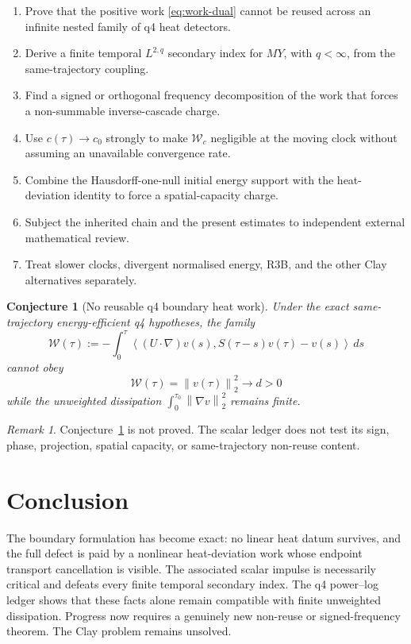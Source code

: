 \documentclass[11pt]{article}
\newtheorem{conjecture}[theorem]{Conjecture}
\theoremstyle{remark}
\newtheorem{remark}[theorem]{Remark}
\newcommand{\norm}[1]{\left\|#1\right\|}
\newcommand{\ip}[2]{\left\langle #1,#2\right\rangle}
\begin{document}
\begin{enumerate}
 \item Prove that the positive work
 \eqref{eq:work-dual} cannot be reused across an infinite nested family
 of q4 heat detectors.
 \item Derive a finite temporal \(L^{2,q}\) secondary index for
 \(MY\), with \(q<\infty\), from the same-trajectory coupling.
 \item Find a signed or orthogonal frequency decomposition of the work
 that forces a non-summable inverse-cascade charge.
 \item Use \(c(\tau)\to c_0\) strongly to make
 \(\mathcal W_c\) negligible at the moving clock without assuming an
 unavailable convergence rate.
 \item Combine the Hausdorff-one-null initial energy support with the
 heat-deviation identity to force a spatial-capacity charge.
 \item Subject the inherited chain and the present estimates to
 independent external mathematical review.
 \item Treat slower clocks, divergent normalised energy, R3B, and the
 other Clay alternatives separately.
\end{enumerate}

\begin{conjecture}[No reusable q4 boundary heat work]
\label{conj:nonreuse}
Under the exact same-trajectory energy-efficient q4 hypotheses, the
family
\[
 \mathcal W(\tau)
 :=
 -\int_0^\tau
 \ip{(U\cdot\nabla)v(s)}
 {S(\tau-s)v(\tau)-v(s)}\,ds
\]
cannot obey
\[
 \mathcal W(\tau)=\norm{v(\tau)}_2^2\longrightarrow d>0
\]
while the unweighted dissipation
\(\int_0^{\tau_0}\norm{\nabla v}^2_2\) remains finite.
\end{conjecture}

\begin{remark}
Conjecture~\ref{conj:nonreuse} is not proved.  The scalar ledger does not
test its sign, phase, projection, spatial capacity, or same-trajectory
non-reuse content.
\end{remark}

\section*{Conclusion}

The boundary formulation has become exact: no linear heat datum survives,
and the full defect is paid by a nonlinear heat-deviation work whose
endpoint transport cancellation is visible.  The associated scalar
impulse is necessarily critical and defeats every finite temporal
secondary index.  The q4 power--log ledger shows that these facts alone
remain compatible with finite unweighted dissipation.  Progress now
requires a genuinely new non-reuse or signed-frequency theorem.  The
Clay problem remains unsolved.
\end{document}
